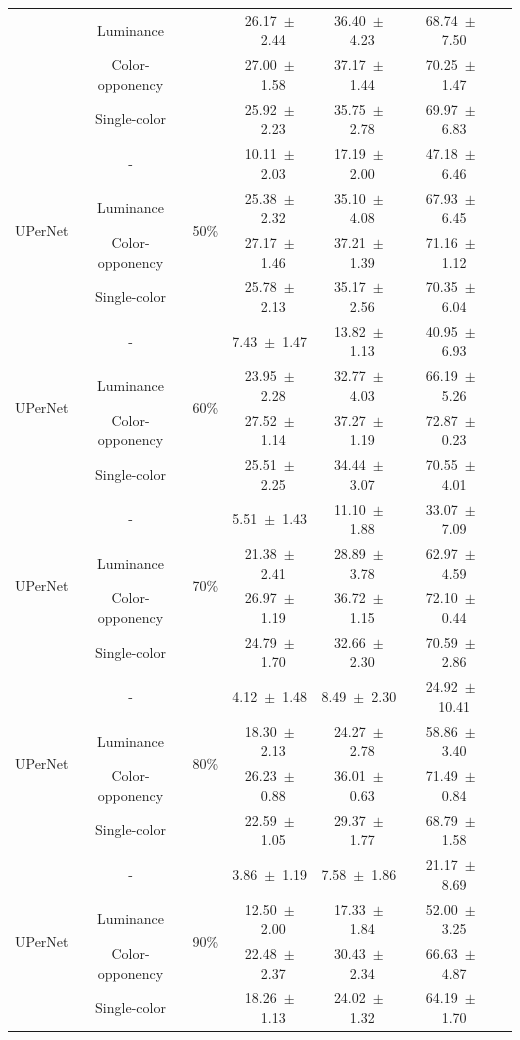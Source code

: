 \begin{table}[h]
\begin{tabular}{@{}lccc ccc@{}}
& Luminance & & 26.17~$\pm$~2.44 & 36.40~$\pm$~4.23 & 68.74~$\pm$~7.50 \\
& Color-opponency & & 27.00~$\pm$~1.58 & 37.17~$\pm$~1.44 & 70.25~$\pm$~1.47 \\
& Single-color & & 25.92~$\pm$~2.23 & 35.75~$\pm$~2.78 & 69.97~$\pm$~6.83 \\
\midrule
\multirow{4}{*}{UPerNet} & - & \multirow{4}{*}{50\%} & 10.11~$\pm$~2.03 & 17.19~$\pm$~2.00 & 47.18~$\pm$~6.46 \\
& Luminance & & 25.38~$\pm$~2.32 & 35.10~$\pm$~4.08 & 67.93~$\pm$~6.45 \\
& Color-opponency & & 27.17~$\pm$~1.46 & 37.21~$\pm$~1.39 & 71.16~$\pm$~1.12 \\
& Single-color & & 25.78~$\pm$~2.13 & 35.17~$\pm$~2.56 & 70.35~$\pm$~6.04 \\
\midrule
\multirow{4}{*}{UPerNet} & - & \multirow{4}{*}{60\%} & 7.43~$\pm$~1.47 & 13.82~$\pm$~1.13 & 40.95~$\pm$~6.93 \\
& Luminance & & 23.95~$\pm$~2.28 & 32.77~$\pm$~4.03 & 66.19~$\pm$~5.26 \\
& Color-opponency & & 27.52~$\pm$~1.14 & 37.27~$\pm$~1.19 & 72.87~$\pm$~0.23 \\
& Single-color & & 25.51~$\pm$~2.25 & 34.44~$\pm$~3.07 & 70.55~$\pm$~4.01 \\
\midrule
\multirow{4}{*}{UPerNet} & - & \multirow{4}{*}{70\%} & 5.51~$\pm$~1.43 & 11.10~$\pm$~1.88 & 33.07~$\pm$~7.09 \\
& Luminance & & 21.38~$\pm$~2.41 & 28.89~$\pm$~3.78 & 62.97~$\pm$~4.59 \\
& Color-opponency & & 26.97~$\pm$~1.19 & 36.72~$\pm$~1.15 & 72.10~$\pm$~0.44 \\
& Single-color & & 24.79~$\pm$~1.70 & 32.66~$\pm$~2.30 & 70.59~$\pm$~2.86 \\
\midrule
\multirow{4}{*}{UPerNet} & - & \multirow{4}{*}{80\%} & 4.12~$\pm$~1.48 & 8.49~$\pm$~2.30 & 24.92~$\pm$~10.41 \\
& Luminance & & 18.30~$\pm$~2.13 & 24.27~$\pm$~2.78 & 58.86~$\pm$~3.40 \\
& Color-opponency & & 26.23~$\pm$~0.88 & 36.01~$\pm$~0.63 & 71.49~$\pm$~0.84 \\
& Single-color & & 22.59~$\pm$~1.05 & 29.37~$\pm$~1.77 & 68.79~$\pm$~1.58 \\
\midrule
\multirow{4}{*}{UPerNet} & - & \multirow{4}{*}{90\%} & 3.86~$\pm$~1.19 & 7.58~$\pm$~1.86 & 21.17~$\pm$~8.69 \\
& Luminance & & 12.50~$\pm$~2.00 & 17.33~$\pm$~1.84 & 52.00~$\pm$~3.25 \\
& Color-opponency & & 22.48~$\pm$~2.37 & 30.43~$\pm$~2.34 & 66.63~$\pm$~4.87 \\
& Single-color & & 18.26~$\pm$~1.13 & 24.02~$\pm$~1.32 & 64.19~$\pm$~1.70 \\
\midrule
\bottomrule
\end{tabular}
\label{tab:sparse_results_upernet_acdc_snow}
\end{table}